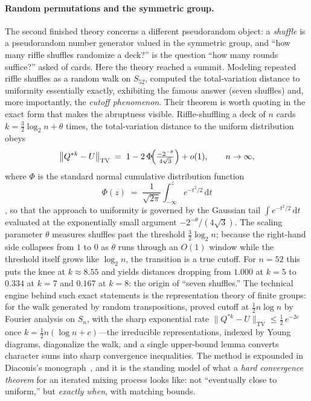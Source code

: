 \paragraph{Random permutations and the symmetric group.}
The second finished theory concerns a different pseudorandom object: a
\emph{shuffle} is a pseudorandom number generator valued in the
symmetric group, and ``how many riffle shuffles randomize a deck?'' is
the question ``how many rounds suffice?'' asked of cards. Here the
theory reached a summit. Modeling repeated riffle shuffles as a random
walk on $S_{52}$, \citet{BayerDiaconis1992} computed the total-variation
distance to uniformity essentially exactly, exhibiting the famous
answer (seven shuffles) and, more importantly, the \emph{cutoff
phenomenon}. Their theorem is worth quoting in the exact form that makes
the abruptness visible. Riffle-shuffling a deck of $n$ cards
$k = \tfrac{3}{2}\log_2 n + \theta$ times, the total-variation distance
to the uniform distribution obeys
\[
  \bigl\| Q^{\ast k} - U \bigr\|_{\mathrm{TV}}
  \;=\; 1 - 2\,\Phi\!\Bigl(\tfrac{-2^{-\theta}}{4\sqrt{3}}\Bigr) + o(1),
  \qquad n \to \infty,
\]
where $\Phi$ is the standard normal cumulative distribution function
\[
  \Phi(z) \;=\; \frac{1}{\sqrt{2\pi}} \int_{-\infty}^{z}
                 e^{-t^{2}/2}\, \mathrm{d}t
\]
\citep[Thm.~1]{BayerDiaconis1992}, so that the approach to uniformity is
governed by the Gaussian tail $\int e^{-t^2/2}\,\mathrm{d}t$ evaluated at
the exponentially small argument $-2^{-\theta}/(4\sqrt 3)$. The scaling parameter
$\theta$ measures shuffles past the threshold $\tfrac{3}{2}\log_2 n$;
because the right-hand side collapses from $1$ to $0$ as $\theta$ runs
through an $O(1)$ window while the threshold itself grows like
$\log_2 n$, the transition is a true cutoff. For $n = 52$ this puts the
knee at $k \approx 8.55$ and yields distances dropping from $1.000$ at
$k=5$ to $0.334$ at $k=7$ and $0.167$ at $k=8$: the origin of ``seven
shuffles.'' The technical engine behind such exact statements is the
representation theory of finite groups: for the walk generated by random
transpositions, \citet{DiaconisShahshahani1981} proved cutoff at
$\tfrac12 n \log n$ by Fourier analysis on $S_n$, with the sharp
exponential rate
$\| Q^{\ast k} - U \|_{\mathrm{TV}} \le \tfrac12\, e^{-2c}$ once
$k = \tfrac12 n(\log n + c)$---the irreducible representations, indexed
by Young diagrams, diagonalize the walk, and a single upper-bound lemma
converts character sums into sharp convergence inequalities. The method is expounded in Diaconis's
monograph~\citep{Diaconis1988}, and it is the standing model of what a
\emph{hard convergence theorem} for an iterated mixing process looks
like: not ``eventually close to uniform,'' but \emph{exactly when},
with matching bounds.

